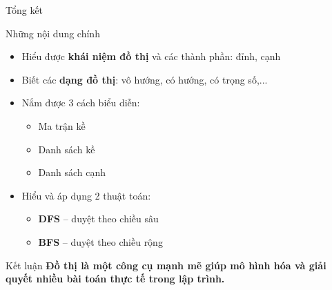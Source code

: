 \documentclass{beamer}
\begin{document}
\begin{frame}{Tổng kết}

\begin{block}{Những nội dung chính}
\begin{itemize}
    \item[$\rightarrow$] Hiểu được \textbf{khái niệm đồ thị} và các thành phần: đỉnh, cạnh
    \pause
    \item[$\rightarrow$] Biết các \textbf{dạng đồ thị}: vô hướng, có hướng, có trọng số,...
    \pause
    \item[$\rightarrow$] Nắm được 3 cách biểu diễn:
    \begin{itemize}
        \item Ma trận kề
        \item Danh sách kề
        \item Danh sách cạnh
    \end{itemize}
    \pause
    \item[$\rightarrow$] Hiểu và áp dụng 2 thuật toán:
    \begin{itemize}
        \item \textbf{DFS} – duyệt theo chiều sâu
        \item \textbf{BFS} – duyệt theo chiều rộng
    \end{itemize}
\end{itemize}
\end{block}

\vspace{0.5cm}

\begin{alertblock}{Kết luận}
\centering
\textbf{Đồ thị là một công cụ mạnh mẽ giúp mô hình hóa và giải quyết nhiều bài toán thực tế trong lập trình.}
\end{alertblock}

\end{frame}
\end{document}
